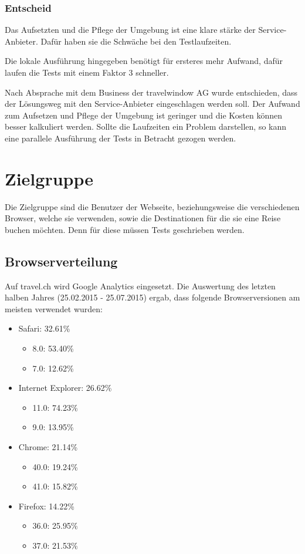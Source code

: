 \subsubsection{Entscheid}
Das Aufsetzten und die Pflege der Umgebung ist eine klare stärke der Service-Anbieter. Dafür haben sie die Schwäche bei den Testlaufzeiten. 

Die lokale Ausführung hingegeben benötigt für ersteres mehr Aufwand, dafür laufen die Tests mit einem Faktor 3 schneller.

Nach Absprache mit dem Business der travelwindow AG wurde entschieden, dass der Lösungsweg mit den  Service-Anbieter eingeschlagen werden soll. Der Aufwand zum Aufsetzen und Pflege der Umgebung ist geringer und die Kosten können besser kalkuliert werden. Sollte die Laufzeiten ein Problem darstellen, so kann eine parallele Ausführung der Tests in Betracht gezogen werden. 

\section{Zielgruppe}
\label{sec:Recherche:Zielgruppe}
Die Zielgruppe sind die Benutzer der Webseite, beziehungsweise die verschiedenen Browser, welche sie verwenden, sowie die Destinationen für die sie eine Reise buchen möchten. Denn für diese müssen Tests geschrieben werden.

\subsection{Browserverteilung}
Auf travel.ch wird Google Analytics eingesetzt. Die Auswertung des letzten halben Jahres (25.02.2015 - 25.07.2015) ergab, dass folgende Browserversionen am meisten verwendet wurden:
\begin{itemize}
\item Safari: 32.61\%
	\begin{itemize}
			\item 8.0: 53.40\%
			\item 7.0: 12.62\%
	\end{itemize}
\item Internet Explorer: 26.62\%
	\begin{itemize}
			\item 11.0: 74.23\%
			\item 9.0: 13.95\%
	\end{itemize}
\item Chrome: 21.14\%
	\begin{itemize}
			\item 40.0: 19.24\%
			\item 41.0: 15.82\%
	\end{itemize}
\item Firefox: 14.22\%
	\begin{itemize}
			\item 36.0: 25.95\%
			\item 37.0: 21.53\%
	\end{itemize}
\end{itemize}

